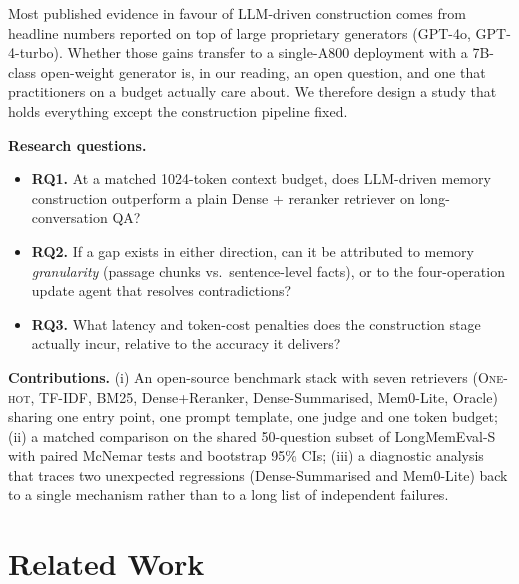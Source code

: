 \documentclass[11pt]{article}
\begin{document}
Most published evidence in favour of LLM-driven construction comes
from headline numbers reported on top of large proprietary
generators (GPT-4o, GPT-4-turbo). Whether those gains transfer to a
single-A800 deployment with a 7B-class open-weight generator is, in
our reading, an open question, and one that practitioners on a
budget actually care about. We therefore design a study that holds
everything except the construction pipeline fixed.

\noindent\textbf{Research questions.}
\begin{itemize}
  \setlength{\itemsep}{2pt}
  \setlength{\topsep}{2pt}
  \item \textbf{RQ1.} At a matched 1024-token context budget, does
        LLM-driven memory construction outperform a plain
        Dense + reranker retriever on long-conversation QA?
  \item \textbf{RQ2.} If a gap exists in either direction, can it be
        attributed to memory \emph{granularity}
        (passage chunks vs.\ sentence-level facts), or to the
        four-operation update agent that resolves contradictions?
  \item \textbf{RQ3.} What latency and token-cost penalties does the
        construction stage actually incur, relative to the accuracy it
        delivers?
\end{itemize}

\noindent\textbf{Contributions.}
(i) An open-source benchmark stack with seven retrievers
(\textsc{One-hot}, \textsc{TF-IDF}, BM25, Dense+Reranker,
Dense-Summarised, Mem0-Lite, Oracle) sharing one entry point,
one prompt template, one judge and one token budget; (ii) a
matched comparison on the shared 50-question subset of
LongMemEval-S with paired McNemar tests and bootstrap 95\% CIs;
(iii) a diagnostic analysis that traces two unexpected regressions
(Dense-Summarised and Mem0-Lite) back to a single mechanism rather
than to a long list of independent failures.

\section{Related Work}
\label{sec:related}
\end{document}
